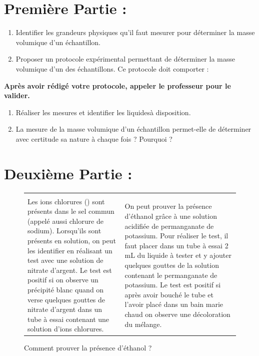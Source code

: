 \documentclass[a4paper,11pt,fleqn]{article}%
\begin{document}
\section*{Première Partie :}
\begin{enumerate}
	\item Identifier les grandeurs physiques qu’il faut mesurer pour déterminer la masse volumique d’un échantillon.
	\item Proposer un protocole expérimental permettant de déterminer la masse volumique d'un des  échantillons. Ce protocole doit comporter :
\end{enumerate}
\begin{center}
		\textbf{Après avoir rédigé votre protocole, appeler le professeur pour le valider.}
	\end{center}

\begin{enumerate}[resume]
	\item Réaliser les mesures et identifier les liquidesà disposition.
	\item La mesure de la masse volumique d’un échantillon permet-elle de déterminer avec certitude sa nature à chaque fois ? Pourquoi ?
\end{enumerate}

\section*{Deuxième Partie :}

\begin{figure}[h!]
	\begin{tabular}{|m{.45\linewidth}|m{.45\linewidth}|}
	\hline
	\caption{Comment prouver la présence d'ions chlorure ?} & \caption{Comment prouver la présence d'éthanol ?}\\
	Les ions chlorures (\ce{Cl-}) sont présents dans le sel commun (appelé aussi chlorure de sodium). Lorsqu’ils sont présents en solution, on peut les identifier en réalisant un test avec une solution de nitrate d’argent. Le test est positif si on observe un précipité blanc quand on verse quelques gouttes de nitrate d’argent dans un tube à essai contenant une solution d’ions chlorures. & On peut prouver la présence d'éthanol grâce à une solution acidifiée de permanganate de potassium. 
Pour réaliser le test, il faut placer dans un tube à essai 2 mL du liquide à tester et y ajouter quelques gouttes de la solution contenant le permanganate de potassium.
Le test est positif si après avoir bouché le tube et l'avoir placé dans un bain marie chaud on observe une décoloration du mélange.\\
\hline	
	\end{tabular}
\end{figure}
\end{document}
